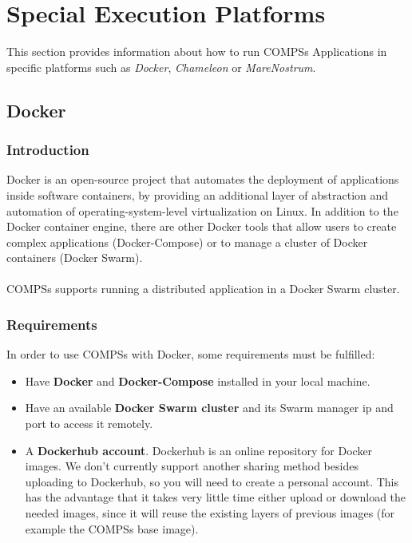 \section{Special Execution Platforms}
\label{sec:Execution_Platfors}

This section provides information about how to run COMPSs Applications in specific platforms such as \textit{Docker},
\textit{Chameleon} or \textit{MareNostrum}.


\subsection{Docker}

\subsubsection{Introduction}
Docker is an open-source project that automates the deployment of applications inside software containers, 
by providing an additional layer of abstraction and automation of operating-system-level virtualization on Linux.
In addition to the Docker container engine, there are other Docker tools that allow users to create complex applications (Docker-Compose) 
or to manage a cluster of Docker containers (Docker Swarm).
\\ \\ 
COMPSs supports running a distributed application in a Docker Swarm cluster.
\\

\subsubsection{Requirements}
In order to use COMPSs with Docker, some requirements must be fulfilled:
\begin{itemize}  
\item Have \textbf{Docker} and \textbf{Docker-Compose} installed in your local machine.
\item Have an available \textbf{Docker Swarm cluster} and its Swarm manager ip and port to access it remotely.
\item A \textbf{Dockerhub account}. Dockerhub is an online repository for Docker images. We don't currently support
      another sharing method besides uploading to Dockerhub, so you will need to create a personal account.
      This has the advantage that it takes very little time either upload or download the needed images, since it 
      will reuse the existing layers of previous images (for example the COMPSs base image).
\end{itemize}



